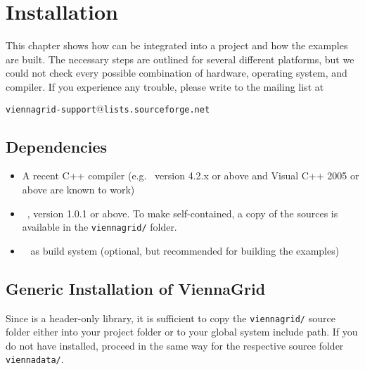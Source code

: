 \chapter{Installation}

This chapter shows how {\ViennaGrid} can be integrated into a project and how
the examples are built. The necessary steps are outlined for several different
platforms, but we could not check every possible combination of hardware,
operating system, and compiler. If you experience any trouble, please write to
the mailing list at \\
\begin{center}
\texttt{viennagrid-support$@$lists.sourceforge.net} 
\end{center}


\section{Dependencies}
\label{dependencies}

\begin{itemize}
 \item A recent C++ compiler (e.g.~{\GCC} version 4.2.x or above and Visual C++
2005 or above are known to work)
 \item {\ViennaData}~\cite{ViennaData}, version 1.0.1 or above. To make {\ViennaGrid} self-contained, a copy of the {\ViennaData} sources is available in the \lstinline|viennagrid/| folder.
 \item {\CMake}~\cite{cmake} as build system (optional, but recommended
for building the examples)
\end{itemize}


\section{Generic Installation of ViennaGrid} \label{sec:viennagrid-installation}
Since {\ViennaGrid} is a header-only library, it is sufficient to copy the 
\lstinline|viennagrid/| source folder either into your project folder or to your global system
include path. If you do not have {\ViennaData} installed, proceed in the same way for the respective source folder \lstinline|viennadata/|. 

